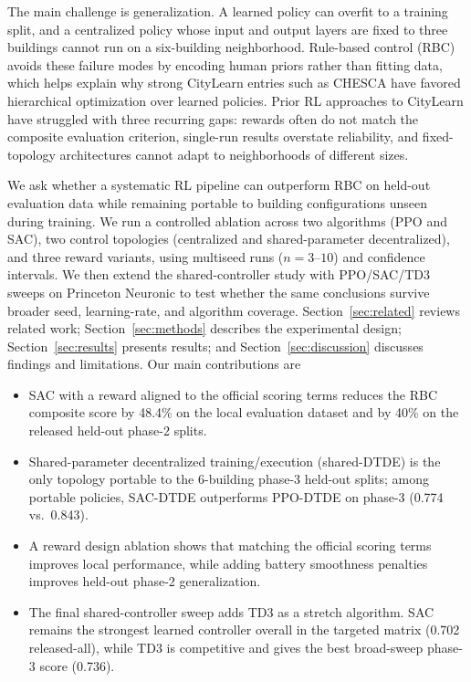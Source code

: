 \documentclass{article}
\begin{document}
The main challenge is generalization. A learned policy can overfit to a training split, and a centralized policy whose input and output layers are fixed to three buildings cannot run on a six-building neighborhood. Rule-based control (RBC) avoids these failure modes by encoding human priors rather than fitting data, which helps explain why strong CityLearn entries such as CHESCA \citep{pinto2024citylearn} have favored hierarchical optimization over learned policies. Prior RL approaches to CityLearn have struggled with three recurring gaps: rewards often do not match the composite evaluation criterion, single-run results overstate reliability, and fixed-topology architectures cannot adapt to neighborhoods of different sizes.

We ask whether a systematic RL pipeline can outperform RBC on held-out evaluation data while remaining portable to building configurations unseen during training. We run a controlled ablation across two algorithms (PPO and SAC), two control topologies (centralized and shared-parameter decentralized), and three reward variants, using multiseed runs ($n = 3$--$10$) and confidence intervals. We then extend the shared-controller study with PPO/SAC/TD3 sweeps on Princeton Neuronic to test whether the same conclusions survive broader seed, learning-rate, and algorithm coverage. Section~\ref{sec:related} reviews related work; Section~\ref{sec:methods} describes the experimental design; Section~\ref{sec:results} presents results; and Section~\ref{sec:discussion} discusses findings and limitations. Our main contributions are

\begin{itemize}
    \item SAC with a reward aligned to the official scoring terms reduces the RBC composite score by 48.4\% on the local evaluation dataset and by 40\% on the released held-out phase-2 splits.
    \item Shared-parameter decentralized training/execution (shared-DTDE) is the only topology portable to the 6-building phase-3 held-out splits; among portable policies, SAC-DTDE outperforms PPO-DTDE on phase-3 (0.774 vs.\ 0.843).
    \item A reward design ablation shows that matching the official scoring terms improves local performance, while adding battery smoothness penalties improves held-out phase-2 generalization.
    \item The final shared-controller sweep adds TD3 as a stretch algorithm. SAC remains the strongest learned controller overall in the targeted matrix (0.702 released-all), while TD3 is competitive and gives the best broad-sweep phase-3 score (0.736).
\end{itemize}
\end{document}
